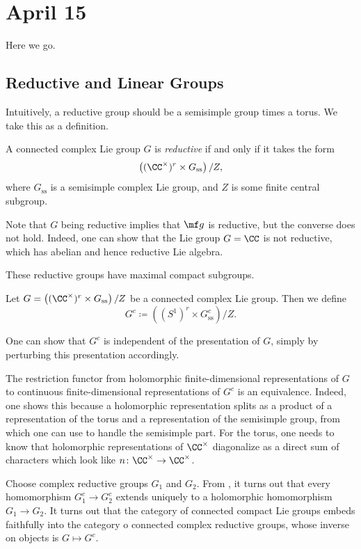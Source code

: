 \documentclass[../notes.tex]{subfiles}
\begin{document}
\section{April 15}
Here we go.

\subsection{Reductive and Linear Groups}
Intuitively, a reductive group should be a semisimple group times a torus. We take this as a definition.
\begin{definition}[reductive]
	A connected complex Lie group $G$ is \textit{reductive} if and only if it takes the form
	\[\left((\CC^\times)^r\times G_{\mathrm{ss}}\right)/Z,\]
	where $G_{\mathrm{ss}}$ is a semisimple complex Lie group, and $Z$ is some finite central subgroup.
\end{definition}
\begin{remark}
	Note that $G$ being reductive implies that $\mf g$ is reductive, but the converse does not hold. Indeed, one can show that the Lie group $G=\CC$ is not reductive, which has abelian and hence reductive Lie algebra.
\end{remark}
These reductive groups have maximal compact subgroups.
\begin{notation}
	Let $G=\left((\CC^\times)^r\times G_{\mathrm{ss}}\right)/Z$ be a connected complex Lie group. Then we define
	\[G^c\coloneqq\left(\left(S^1\right)^r\times G_{\mathrm{ss}}^c\right)/Z.\]
\end{notation}
\begin{remark}
	One can show that $G^c$ is independent of the presentation of $G$, simply by perturbing this presentation accordingly.
\end{remark}
\begin{remark} \label{rem:restrict-reps}
	The restriction functor from holomorphic finite-dimensional representations of $G$ to continuous finite-dimensional representations of $G^c$ is an equivalence. Indeed, one shows this because a holomorphic representation splits as a product of a representation of the torus and a representation of the semisimple group, from which one can use  to handle the semisimple part. For the torus, one needs to know that holomorphic representations of $\CC^\times$ diagonalize as a direct sum of characters which look like $n\colon\CC^\times\to\CC^\times$.
\end{remark}
\begin{remark}
	Choose complex reductive groups $G_1$ and $G_2$. From , it turns out that every homomorphism $G_1^c\to G_2^c$ extends uniquely to a holomorphic homomorphism $G_1\to G_2$. It turns out that the category of connected compact Lie groups embeds faithfully into the category o connected complex reductive groups, whose inverse on objects is $G\mapsto G^c$.
\end{remark}
\end{document}
